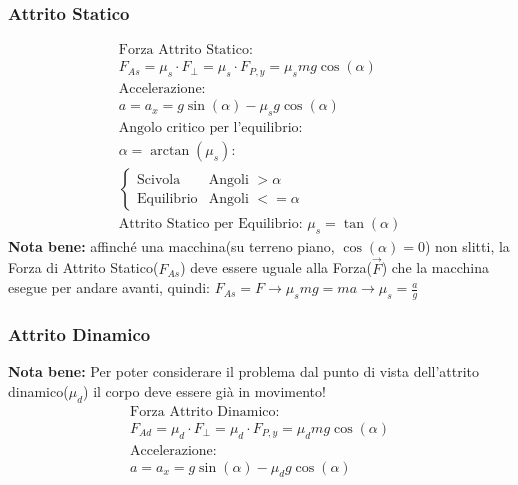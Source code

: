 \subsubsection{Attrito Statico}
\begin{gather*}
    \text{Forza Attrito Statico: } \\ F_{As} = \mu_s \cdot F_\perp = \mu_s \cdot F_{P, y} = \mu_s m g \cos (\alpha) \\
    \text{Accelerazione: } \\ a = a_x = g \sin (\alpha) - \mu_s g \cos (\alpha) \\
    \text{Angolo critico per l'equilibrio: } \\ \alpha = \arctan (\mu_s) : \\
    \begin{cases}
        \text{Scivola} & \text{Angoli } > \alpha \\
        \text{Equilibrio} & \text{Angoli } <= \alpha
    \end{cases}    \\
    \text{Attrito Statico per Equilibrio: } \mu_s = \tan (\alpha)
\end{gather*}
\textbf{Nota bene: } affinché una macchina(su terreno piano, $\cos (\alpha) = 0$) non slitti, la Forza di Attrito Statico($F_{As}$) deve essere uguale alla Forza($\vec{F}$) che la macchina esegue per andare avanti, quindi: $F_{As} = F \rightarrow \mu_s m g = m a \rightarrow \mu_s = \frac{a}{g}$
\subsubsection{Attrito Dinamico}
\textbf{Nota bene: } Per poter considerare il problema dal punto di vista dell'attrito dinamico($\mu_d$) il corpo deve essere già in movimento!
\begin{gather*}
    \text{Forza Attrito Dinamico:} \\ F_{Ad} = \mu_d \cdot F_\perp = \mu_d \cdot F_{P, y} = \mu_d m g \cos (\alpha) \\
    \text{Accelerazione: } \\ a = a_x = g \sin (\alpha) - \mu_d g \cos (\alpha)
\end{gather*}




